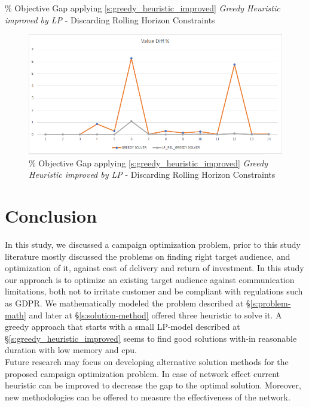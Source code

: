\documentclass[11pt]{article}
\begin{document}
{\begin{landscape}
        \begin{table}[htb]
                \centering
                \caption[Short Caption for LoT]{\% Objective Gap applying \ref{s:greedy_heuristic_improved} \textit{Greedy Heuristic improved by LP} - Discarding Rolling Horizon Constraints}\label{table:tbl_test_obj_diff_bett_no_rh}
        \end{table}
        \begin{figure}[htp]
            \centering
            \includegraphics[width=12cm]{value_diff_bett_no_rh}
            \caption{\% Objective Gap applying \ref{s:greedy_heuristic_improved} \textit{Greedy Heuristic improved by LP} - Discarding Rolling Horizon Constraints}
            \label{fig:fig_value_diff_bett_no_rh}
        \end{figure}
    \end{landscape}
    \clearpage%
}

\newpage


\newpage

\section{Conclusion} \label{s:conclusion}
In this study, we discussed a campaign optimization problem, prior to this study literature mostly discussed the problems on finding right target audience, and optimization of it, against cost of delivery and return of investment. In this study our approach is to optimize an existing target audience against communication limitations, both not to irritate customer and be compliant with regulations such as GDPR. We mathematically modeled the problem described at \S \ref{s:problem-math} and later at \S \ref{s:solution-method} offered three heuristic to solve it. A greedy approach that starts with a small LP-model described at \S \ref{s:greedy_heuristic_improved} seems to find good solutions with-in reasonable duration with low memory and cpu.\\
Future research may focus on developing alternative solution methods for the proposed campaign optimization problem. In case of network effect current heuristic can be improved to decrease the gap to the optimal solution. Moreover, new methodologies can be offered to measure the effectiveness of the network.
\newpage




\end{document}
